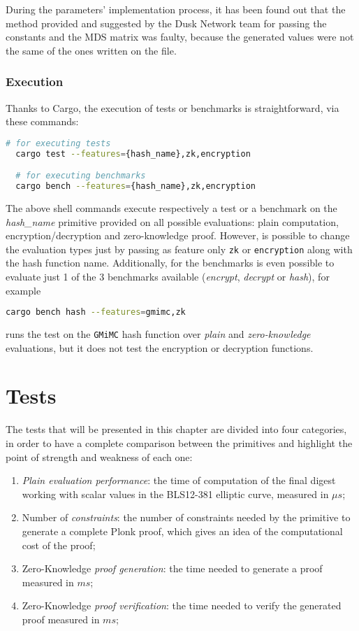 \documentclass[12pt, a4paper]{report}
\begin{document}
\begin{note}
  During the parameters' implementation process, it has been found out that the method provided and suggested by the Dusk Network team for passing the constants and the MDS matrix was faulty, because the generated values were not the same of the ones written on the file.
\end{note}

\subsection{Execution}\label{subsec:execution}

Thanks to Cargo, the execution of tests or benchmarks is straightforward, via these commands:
\begin{lstlisting}[language=bash]
  # for executing tests
  cargo test --features={hash_name},zk,encryption

  # for executing benchmarks
  cargo bench --features={hash_name},zk,encryption
\end{lstlisting}
The above shell commands execute respectively a test or a benchmark on the \textit{hash\_name} primitive provided on all possible evaluations: plain computation, encryption/decryption and zero-knowledge proof.
However, is possible to change the evaluation types just by passing as feature only \texttt{zk} or \texttt{encryption} along with the hash function name.
Additionally, for the benchmarks is even possible to evaluate just 1 of the 3 benchmarks available (\textit{encrypt}, \textit{decrypt} or \textit{hash}), for example
\begin{lstlisting}[language=bash]
  cargo bench hash --features=gmimc,zk
\end{lstlisting}
runs the test on the \texttt{GMiMC} hash function over \textit{plain} and \textit{zero-knowledge} evaluations, but it does not test the encryption or decryption functions.

\chapter{Tests}\label{chap:tests}

The tests that will be presented in this chapter are divided into four categories, in order to have a complete comparison between the primitives and highlight the point of strength and weakness of each one:
\begin{enumerate}
  \item \textit{Plain evaluation performance}: the time of computation of the final digest working with scalar values in the BLS12-381 elliptic curve, measured in $\mu s$;
  \item Number of \textit{constraints}: the number of constraints needed by the primitive to generate a complete \textsf{Plonk} proof, which gives an idea of the computational cost of the proof;
  \item Zero-Knowledge \textit{proof generation}: the time needed to generate a proof measured in $ms$;
  \item Zero-Knowledge \textit{proof verification}: the time needed to verify the generated proof measured in $ms$;
\end{enumerate}
\end{document}
